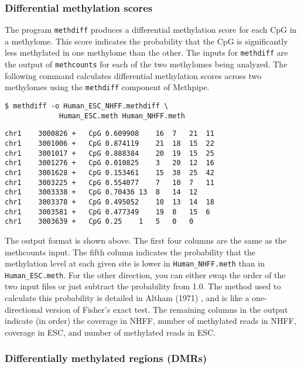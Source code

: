 \documentclass[10pt]{article}
\newcommand{\prog}[1]{\texttt{#1}}
\newcommand{\fn}[1]{\texttt{#1}}
\begin{document}
\subsubsection{Differential methylation scores}
\label{sec:methdiff}

The program \prog{methdiff} produces a differential methylation score
for each CpG in a methylome. This score indicates the probability that
the CpG is significantly less methylated in one methylome than the
other. The inputs for \prog{methdiff} are the output of
\prog{methcounts} for each of the two methylomes being analyzed. The
following command calculates differential methylation scores across
two methylomes using the \prog{methdiff} component of Methpipe.
\begin{verbatim}
$ methdiff -o Human_ESC_NHFF.methdiff \
             Human_ESC.meth Human_NHFF.meth
\end{verbatim}

{\small{%
\begin{verbatim}
chr1	3000826	+	CpG	0.609908	16	7	21	11
chr1	3001006	+	CpG	0.874119	21	18	15	22
chr1	3001017	+	CpG	0.888384	20	19	15	25
chr1	3001276	+	CpG	0.010825	3	20	12	16
chr1	3001628	+	CpG	0.153461	15	38	25	42
chr1	3003225	+	CpG	0.554077	7	10	7	11
chr1	3003338	+	CpG	0.70436	13	8	14	12
chr1	3003378	+	CpG	0.495052	10	13	14	18
chr1	3003581	+	CpG	0.477349	19	8	15	6
chr1	3003639	+	CpG	0.25	1	5	0	0
\end{verbatim}%
}}

The output format is shown above. The first four columns are the same
as the methcounts input. The fifth column indicates the probability that
the methylation level at each given site is lower in \fn{Human\_NHFF.meth}
than in \fn{Human\_ESC.meth}. For the other direction, you can either swap
the order of the two input files or just subtract the probability from 1.0.
The method used to calculate this probability is detailed in Altham (1971)
\cite{altham1969exact}, and is like a one-directional version of Fisher's
exact test.  The remaining columns in the output indicate (in order) the
coverage in NHFF, number of methylated reads in NHFF, coverage in ESC,
and number of methylated reads in ESC.

\subsubsection{Differentially methylated regions (DMRs)}
\label{sec:dmr}
\end{document}
